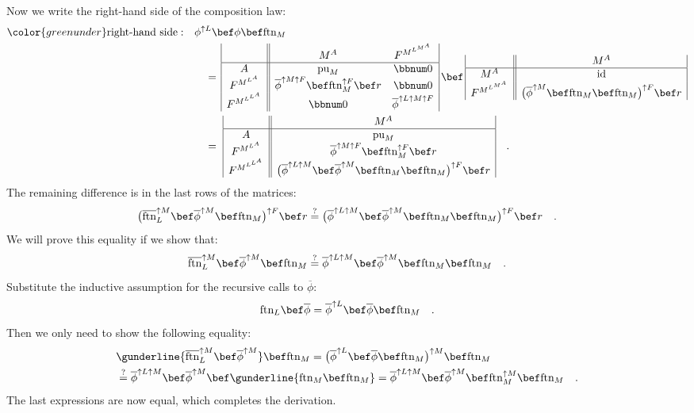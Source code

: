 Now we write the right-hand side of the composition law:
\begin{align*}
{\color{greenunder}\text{right-hand side}:}\quad & \phi^{\uparrow L}\bef\phi\bef\text{ftn}_{M}\\
 & \quad=\,\begin{array}{|c||cc|}
 & M^{A} & F^{M^{L^{M^{A}}}}\\
\hline A & \text{pu}_{M} & \bbnum 0\\
F^{M^{L^{A}}} & \overline{\phi}^{\uparrow M\uparrow F}\bef\text{ftn}_{M}^{\uparrow F}\bef r & \bbnum 0\\
F^{M^{L^{L^{A}}}} & \bbnum 0 & \overline{\phi}^{\uparrow L\uparrow M\uparrow F}
\end{array}\,\bef\,\begin{array}{|c||c|}
 & M^{A}\\
\hline M^{A} & \text{id}\\
F^{M^{L^{M^{A}}}} & \big(\overline{\phi}^{\uparrow M}\bef\text{ftn}_{M}\bef\text{ftn}_{M}\big)^{\uparrow F}\bef r
\end{array}\\
 & \quad=\,\,\begin{array}{|c||c|}
 & M^{A}\\
\hline A & \text{pu}_{M}\\
F^{M^{L^{A}}} & \overline{\phi}^{\uparrow M\uparrow F}\bef\text{ftn}_{M}^{\uparrow F}\bef r\\
F^{M^{L^{L^{A}}}} & \big(\overline{\phi}^{\uparrow L\uparrow M}\bef\overline{\phi}^{\uparrow M}\bef\text{ftn}_{M}\bef\text{ftn}_{M}\big)^{\uparrow F}\bef r
\end{array}\quad.
\end{align*}
The remaining difference is in the last rows of the matrices:
\[
\big(\overline{\text{ftn}}_{L}^{\uparrow M}\bef\overline{\phi}^{\uparrow M}\bef\text{ftn}_{M}\big)^{\uparrow F}\bef r\overset{?}{=}\big(\overline{\phi}^{\uparrow L\uparrow M}\bef\overline{\phi}^{\uparrow M}\bef\text{ftn}_{M}\bef\text{ftn}_{M}\big)^{\uparrow F}\bef r\quad.
\]
We will prove this equality if we show that:
\[
\overline{\text{ftn}}_{L}^{\uparrow M}\bef\overline{\phi}^{\uparrow M}\bef\text{ftn}_{M}\overset{?}{=}\overline{\phi}^{\uparrow L\uparrow M}\bef\overline{\phi}^{\uparrow M}\bef\text{ftn}_{M}\bef\text{ftn}_{M}\quad.
\]
Substitute the inductive assumption for the recursive calls to $\overline{\phi}$:
\[
\text{ftn}_{L}\bef\overline{\phi}=\overline{\phi}^{\uparrow L}\bef\overline{\phi}\bef\text{ftn}_{M}\quad.
\]
Then we only need to show the following equality:
\begin{align*}
 & \gunderline{\overline{\text{ftn}}_{L}^{\uparrow M}\bef\overline{\phi}^{\uparrow M}}\bef\text{ftn}_{M}=\big(\overline{\phi}^{\uparrow L}\bef\overline{\phi}\bef\text{ftn}_{M}\big)^{\uparrow M}\bef\text{ftn}_{M}\\
 & \overset{?}{=}\overline{\phi}^{\uparrow L\uparrow M}\bef\overline{\phi}^{\uparrow M}\bef\gunderline{\text{ftn}_{M}\bef\text{ftn}_{M}}=\overline{\phi}^{\uparrow L\uparrow M}\bef\overline{\phi}^{\uparrow M}\bef\text{ftn}_{M}^{\uparrow M}\bef\text{ftn}_{M}\quad.
\end{align*}
The last expressions are now equal, which completes the derivation.

